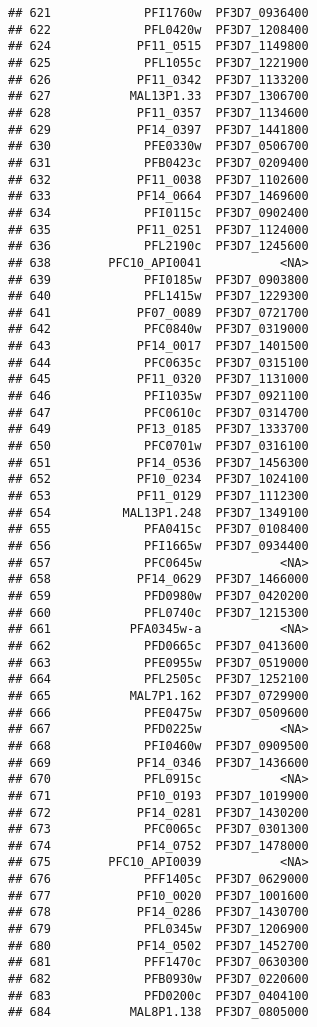 \documentclass{article}\usepackage[]{graphicx}\usepackage[]{color}
\makeatletter
\newenvironment{kframe}{%
 \def\at@end@of@kframe{}%
 \ifinner\ifhmode%
  \def\at@end@of@kframe{\end{minipage}}%
  \begin{minipage}{\columnwidth}%
 \fi\fi%
 \def\FrameCommand##1{\hskip\@totalleftmargin \hskip-\fboxsep
 \colorbox{shadecolor}{##1}\hskip-\fboxsep
     \hskip-\linewidth \hskip-\@totalleftmargin \hskip\columnwidth}%
 \MakeFramed {\advance\hsize-\width
   \@totalleftmargin\z@ \linewidth\hsize
   \@setminipage}}%
 {\par\unskip\endMakeFramed%
 \at@end@of@kframe}
\newenvironment{knitrout}{}{} %
\makeatother
\begin{document}
\begin{knitrout}
\begin{kframe}
\begin{verbatim}
## 621             PFI1760w  PF3D7_0936400
## 622             PFL0420w  PF3D7_1208400
## 624            PF11_0515  PF3D7_1149800
## 625             PFL1055c  PF3D7_1221900
## 626            PF11_0342  PF3D7_1133200
## 627           MAL13P1.33  PF3D7_1306700
## 628            PF11_0357  PF3D7_1134600
## 629            PF14_0397  PF3D7_1441800
## 630             PFE0330w  PF3D7_0506700
## 631             PFB0423c  PF3D7_0209400
## 632            PF11_0038  PF3D7_1102600
## 633            PF14_0664  PF3D7_1469600
## 634             PFI0115c  PF3D7_0902400
## 635            PF11_0251  PF3D7_1124000
## 636             PFL2190c  PF3D7_1245600
## 638        PFC10_API0041           <NA>
## 639             PFI0185w  PF3D7_0903800
## 640             PFL1415w  PF3D7_1229300
## 641            PF07_0089  PF3D7_0721700
## 642             PFC0840w  PF3D7_0319000
## 643            PF14_0017  PF3D7_1401500
## 644             PFC0635c  PF3D7_0315100
## 645            PF11_0320  PF3D7_1131000
## 646             PFI1035w  PF3D7_0921100
## 647             PFC0610c  PF3D7_0314700
## 649            PF13_0185  PF3D7_1333700
## 650             PFC0701w  PF3D7_0316100
## 651            PF14_0536  PF3D7_1456300
## 652            PF10_0234  PF3D7_1024100
## 653            PF11_0129  PF3D7_1112300
## 654          MAL13P1.248  PF3D7_1349100
## 655             PFA0415c  PF3D7_0108400
## 656             PFI1665w  PF3D7_0934400
## 657             PFC0645w           <NA>
## 658            PF14_0629  PF3D7_1466000
## 659             PFD0980w  PF3D7_0420200
## 660             PFL0740c  PF3D7_1215300
## 661           PFA0345w-a           <NA>
## 662             PFD0665c  PF3D7_0413600
## 663             PFE0955w  PF3D7_0519000
## 664             PFL2505c  PF3D7_1252100
## 665           MAL7P1.162  PF3D7_0729900
## 666             PFE0475w  PF3D7_0509600
## 667             PFD0225w           <NA>
## 668             PFI0460w  PF3D7_0909500
## 669            PF14_0346  PF3D7_1436600
## 670             PFL0915c           <NA>
## 671            PF10_0193  PF3D7_1019900
## 672            PF14_0281  PF3D7_1430200
## 673             PFC0065c  PF3D7_0301300
## 674            PF14_0752  PF3D7_1478000
## 675        PFC10_API0039           <NA>
## 676             PFF1405c  PF3D7_0629000
## 677            PF10_0020  PF3D7_1001600
## 678            PF14_0286  PF3D7_1430700
## 679             PFL0345w  PF3D7_1206900
## 680            PF14_0502  PF3D7_1452700
## 681             PFF1470c  PF3D7_0630300
## 682             PFB0930w  PF3D7_0220600
## 683             PFD0200c  PF3D7_0404100
## 684           MAL8P1.138  PF3D7_0805000

\end{verbatim}
\end{kframe}
\end{knitrout}
\end{document}
